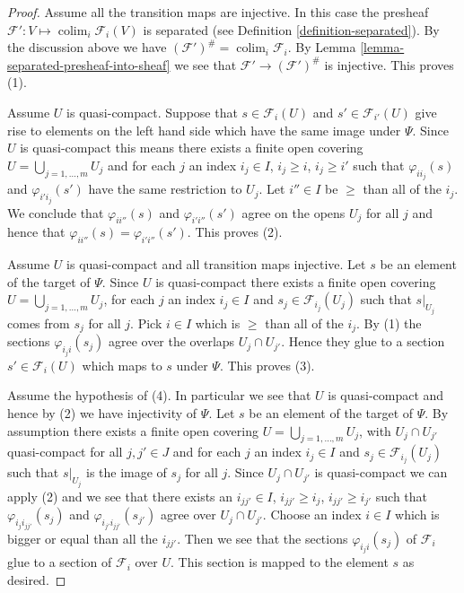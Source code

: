 \documentclass{stacks-project}
\theoremstyle{plain}
\theoremstyle{definition}
\theoremstyle{remark}
\numberwithin{equation}{subsection}
\def\colim{\mathop{\mathrm{colim}}\nolimits}
\begin{document}
\begin{proof}
Assume all the transition maps are injective. In this case the presheaf
$\mathcal{F}' : V \mapsto \colim_i \mathcal{F}_i(V)$ is
separated (see Definition \ref{definition-separated}).
By the discussion above we have
$(\mathcal{F}')^\# = \colim_i \mathcal{F}_i$.
By Lemma \ref{lemma-separated-presheaf-into-sheaf} we see that
$\mathcal{F}' \to (\mathcal{F}')^\#$ is injective. This proves (1).

\medskip\noindent
Assume $U$ is quasi-compact.
Suppose that $s \in \mathcal{F}_i(U)$ and
$s' \in \mathcal{F}_{i'}(U)$ give rise to elements on
the left hand side which have the same image under $\Psi$.
Since $U$ is quasi-compact this means there exists
a finite open covering $U = \bigcup_{j = 1, \ldots, m} U_j$
and for each $j$ an index $i_j \in I$, $i_j \geq i$, $i_j \geq i'$
such that $\varphi_{ii_j}(s)$ and $\varphi_{i'i_j}(s')$ have the
same restriction to $U_j$.
Let $i''\in I$ be $\geq$ than all of the $i_j$.
We conclude that $\varphi_{ii''}(s)$ and $\varphi_{i'i''}(s')$
agree on the opens $U_j$ for all $j$ and hence that
$\varphi_{ii''}(s) = \varphi_{i'i''}(s')$. This proves (2).

\medskip\noindent
Assume $U$ is quasi-compact and all transition maps injective.
Let $s$ be an element of the target of $\Psi$.
Since $U$ is quasi-compact
there exists a finite open covering $U = \bigcup_{j = 1, \ldots, m} U_j$,
for each $j$ an index $i_j \in I$ and $s_j \in \mathcal{F}_{i_j}(U_j)$
such that $s|_{U_j}$ comes from $s_j$ for all $j$.
Pick $i \in I$ which is $\geq$ than all of the $i_j$.
By (1) the sections $\varphi_{i_ji}(s_j)$ agree over the
overlaps $U_j \cap U_{j'}$. Hence they glue to a section
$s' \in \mathcal{F}_i(U)$ which maps to $s$ under $\Psi$.
This proves (3).

\medskip\noindent
Assume the hypothesis of (4). In particular we see that
$U$ is quasi-compact and hence by (2) we have injectivity of $\Psi$.
Let $s$ be an element of the target of $\Psi$.
By assumption there  exists a finite open covering
$U = \bigcup_{j = 1, \ldots, m} U_j$, with $U_j \cap U_{j'}$
quasi-compact for all $j, j' \in J$ and
for each $j$ an index $i_j \in I$ and $s_j \in \mathcal{F}_{i_j}(U_j)$
such that $s|_{U_j}$ is the image of $s_j$ for all $j$.
Since $U_j \cap U_{j'}$ is quasi-compact we can apply (2)
and we see that there exists an $i_{jj'} \in I$,
$i_{jj'} \geq i_j$, $i_{jj'} \geq i_{j'}$ such that
$\varphi_{i_ji_{jj'}}(s_j)$ and $\varphi_{i_{j'}i_{jj'}}(s_{j'})$
agree over $U_j \cap U_{j'}$. Choose an index $i \in I$
which is bigger or equal than all the $i_{jj'}$. Then we see that
the sections $\varphi_{i_ji}(s_j)$ of $\mathcal{F}_i$ glue
to a section of $\mathcal{F}_i$ over $U$. This section is mapped
to the element $s$ as desired.
\end{proof}
\end{document}
